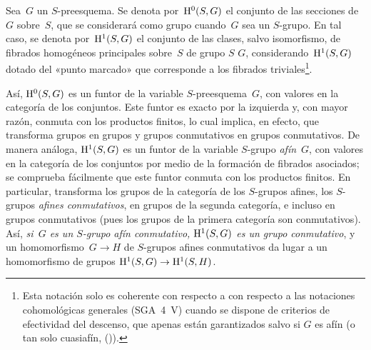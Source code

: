 
\begin{definition}
\label{XI.4.4}
Sea~$G$ un $S$-preesquema. Se denota por~$\mathrm H^0(S,G)$ el conjunto de las
secciones de~$G$ sobre~$S$, que se considerará como grupo cuando~$G$ sea un
$S$-grupo. En tal caso, se denota por~$\mathrm H^1(S,G)$ el conjunto de las clases,
salvo isomorfismo, de fibrados homogéneos principales sobre~$S$ de grupo
{$S$}
{$G$},
considerando~$\mathrm H^1(S,G)$ dotado del «punto marcado» que corresponde a los
fibrados triviales\footnote{\label{note-296}Esta notación solo es coherente
{con respecto a}
{con respecto a}
las notaciones cohomológicas generales (SGA~4~V) cuando se dispone de
criterios de efectividad del descenso, que apenas están garantizados salvo si
$G$ es afín (o tan solo cuasiafín, \cf ()).}.
\end{definition}

Así, $\mathrm H^0(S,G)$ es un funtor de la variable $S$-preesquema~$G$, con valores
en la categoría de los conjuntos. Este funtor es exacto por la izquierda y,
con mayor razón, conmuta con los productos finitos, lo cual implica, en
efecto, que transforma grupos en grupos y grupos conmutativos en grupos
conmutativos. De manera análoga, $\mathrm H^1(S,G)$ es un funtor de la variable
$S$-grupo \emph{afín}~$G$, con valores en la categoría de los conjuntos por
medio de la formación de fibrados asociados; se comprueba fácilmente que
este funtor conmuta con los productos finitos. En particular, transforma los
grupos de la categoría de los $S$-grupos afines, \ie los $S$-grupos
\emph{afines conmutativos}, en grupos de la segunda categoría, e incluso en
grupos conmutativos (pues los grupos de la primera categoría son
conmutativos). Así, \emph{si~$G$ es un $S$-grupo afín conmutativo,
$\mathrm H^1(S,G)$ es un grupo conmutativo}, y un homomorfismo~$G\to H$ de
$S$-grupos afines conmutativos da lugar a un homomorfismo de grupos
$\mathrm H^1(S,G)\to\mathrm H^1(S,H)$.

